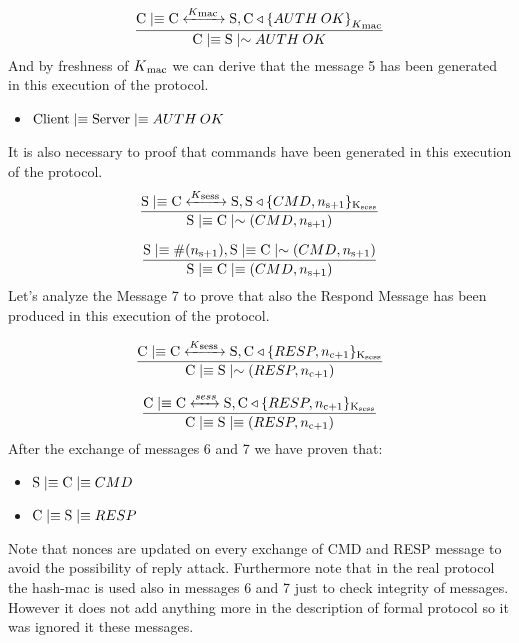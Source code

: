 \[
	\frac{\textnormal{C} \mid\equiv \textnormal{C} \xleftrightarrow{K\textsubscript{mac }} \textnormal{S}, \textnormal{C} \triangleleft { \{ AUTH\:OK \} }_{K\textsubscript{mac}}}
	{\textnormal{C} \mid\equiv \textnormal{S} \mid\sim {AUTH\:OK}} 
\]
And by freshness of \(K\textsubscript{mac}\) we can derive that the message 5 has been generated in this execution of the protocol. 
\begin{itemize}
	\item $\textnormal{Client} \mid\equiv \textnormal{Server}\mid\equiv AUTH\:OK$
\end{itemize}
It is also necessary to proof that commands have been generated in this execution of the protocol.
\[ \frac{\textnormal{S} \mid\equiv \textnormal{C} \xleftrightarrow{K\textsubscript{sess }} \textnormal{S}, \textnormal{S} \triangleleft \lbrace CMD, n\textsubscript{s+1} \rbrace \textsubscript{K\textsubscript{sess}} }{ \textnormal{S} \mid\equiv \textnormal{C} \mid\sim (CMD,n\textsubscript{s+1}) }\]

\[ \frac{ \textnormal{S} \mid\equiv \#(n\textsubscript{s+1}), \textnormal{S} \mid\equiv \textnormal{C} \mid\sim (CMD,n\textsubscript{s+1}) } 
        {\textnormal{S} \mid\equiv \textnormal{C} \mid\equiv (CMD,n\textsubscript{s+1})}\]
Let's analyze the Message 7 to prove that also the Respond Message has been produced in this execution of the protocol.

\[ \frac{\textnormal{C} \mid\equiv \textnormal{C} \xleftrightarrow{K\textsubscript{sess }} \textnormal{S}, \textnormal{C} \triangleleft \lbrace RESP, n\textsubscript{c+1} \rbrace \textsubscript{K\textsubscript{sess}}}{ \textnormal{C} \mid\equiv \textnormal{S} \mid\sim (RESP,n\textsubscript{c+1})} 
\]

\[ \frac{\textnormal{C} \mid\equiv \textnormal{C} \xleftrightarrow{sess } \textnormal{S}, \textnormal{C} \triangleleft \lbrace RESP,n\textsubscript{c+1} \rbrace \textsubscript{K\textsubscript{sess}} }{\textnormal{C} \mid\equiv \textnormal{S} \mid\equiv (RESP,n\textsubscript{c+1})}
\]
After the exchange of messages 6 and 7 we have proven that:
\begin{itemize}
	\item \( \textnormal{S} \mid\equiv \textnormal{C} \mid\equiv CMD\)
	\item \( \textnormal{C} \mid\equiv \textnormal{S} \mid\equiv RESP\)
\end{itemize}
Note that nonces are updated on every exchange of CMD and RESP message to avoid the possibility of reply attack. Furthermore note that in the real protocol the hash-mac is used also in messages 6 and 7 just to check integrity of messages. However it does not add anything more in the description of formal protocol so it was ignored it these messages.
